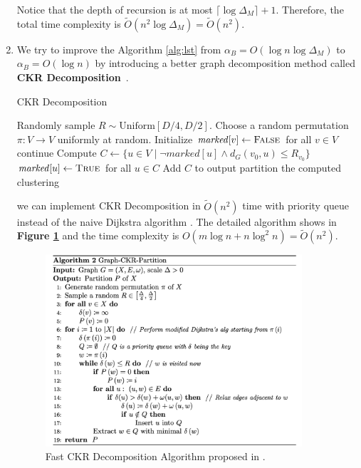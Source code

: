 \begin{answer}
\begin{enumerate}[label=\alph*).]
        Notice that the depth of recursion is at most $\lceil \log \Delta_M \rceil + 1$. Therefore, the total time complexity is $\tilde{O}(n^2\log \Delta_M) = \tilde{O}(n^2)$.
        \item We try to improve the Algorithm \ref{alg:lst} from $\alpha_B = O(\log n \log \Delta_M)$ to $\alpha_B = O(\log n)$ by introducing a better graph decomposition method called 
        \textbf{CKR Decomposition}~\cite{CKR_Decomposition}.
        \begin{algo}
            \caption{CKR Decomposition}
            \label{alg:ckr}
            \begin{algorithmic}[1]
                \State Randomly sample $R \sim \text{Uniform}[D/4, D/2]$.
                \State Choose a random permutation $\pi: V \to V$ uniformly at random.
                \State Initialize $\mathit{marked}[v] \gets \textsc{False}$ for all $v \in V$
                        \State continue     
                    \EndIf
                    \State Compute $C \gets \{u \in V \mid \lnot marked[u] \land  d_G(v_0,u) \leq R_{v_0}\}$
                    \State $\mathit{marked}[u] \gets \textsc{True}$ for all $u \in C$
                    \State Add $C$ to output partition
                \EndFor
                \State \Return the computed clustering
            \end{algorithmic}
        \end{algo}
        we can implement CKR Decomposition in $\tilde{O}(n^2)$ time with priority queue instead of the naive Dijkstra algorithm \cite{mendel2009fastckrpartitionssparse}. 
        The detailed algorithm shows in \textbf{Figure \ref{fig:ckr}} and the time complexity is $O(m\log n  + n\log^2 n) = \tilde{O}(n^2)$.
        \begin{figure}[htbp]
            \centering
            \includegraphics[width=0.9\textwidth]{./images/Graph-CKR.png}
            \caption{Fast CKR Decomposition Algorithm proposed in \cite{mendel2009fastckrpartitionssparse}.}
            \label{fig:ckr}
        \end{figure}


\end{enumerate}
\end{answer}
